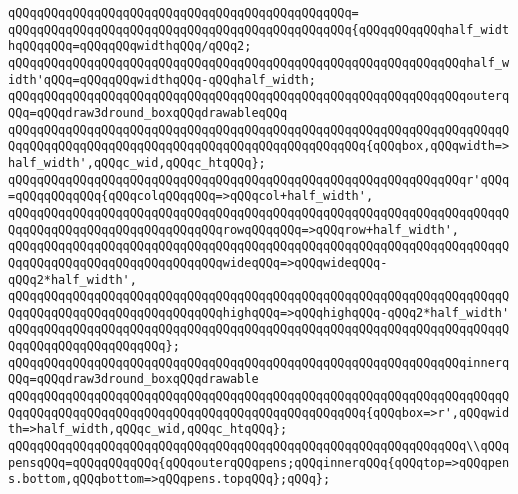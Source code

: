 \verb|qQQqqQQqqQQqqQQqqQQqqQQqqQQqqQQqqQQqqQQqqQQqqQQq=|\newline
\verb|qQQqqQQqqQQqqQQqqQQqqQQqqQQqqQQqqQQqqQQqqQQqqQQq{qQQqqQQqqQQqhalf_widthqQQqqQQq=qQQqqQQqwidthqQQq/qQQq2;|\newline
\verb|qQQqqQQqqQQqqQQqqQQqqQQqqQQqqQQqqQQqqQQqqQQqqQQqqQQqqQQqqQQqqQQqhalf_width'qQQq=qQQqqQQqwidthqQQq-qQQqhalf_width;|\newline
\newline
\verb|qQQqqQQqqQQqqQQqqQQqqQQqqQQqqQQqqQQqqQQqqQQqqQQqqQQqqQQqqQQqqQQqouterqQQq=qQQqdraw3dround_boxqQQqdrawableqQQq|\newline
\verb|qQQqqQQqqQQqqQQqqQQqqQQqqQQqqQQqqQQqqQQqqQQqqQQqqQQqqQQqqQQqqQQqqQQqqQQqqQQqqQQqqQQqqQQqqQQqqQQqqQQqqQQqqQQqqQQqqQQqqQQq{qQQqbox,qQQqwidth=>half_width',qQQqc_wid,qQQqc_htqQQq};|\newline
\newline
\verb|qQQqqQQqqQQqqQQqqQQqqQQqqQQqqQQqqQQqqQQqqQQqqQQqqQQqqQQqqQQqqQQqr'qQQq=qQQqqQQqqQQq{qQQqcolqQQqqQQq=>qQQqcol+half_width',|\newline
\verb|qQQqqQQqqQQqqQQqqQQqqQQqqQQqqQQqqQQqqQQqqQQqqQQqqQQqqQQqqQQqqQQqqQQqqQQqqQQqqQQqqQQqqQQqqQQqqQQqqQQqrowqQQqqQQq=>qQQqrow+half_width',|\newline
\verb|qQQqqQQqqQQqqQQqqQQqqQQqqQQqqQQqqQQqqQQqqQQqqQQqqQQqqQQqqQQqqQQqqQQqqQQqqQQqqQQqqQQqqQQqqQQqqQQqqQQqwideqQQq=>qQQqwideqQQq-qQQq2*half_width',|\newline
\verb|qQQqqQQqqQQqqQQqqQQqqQQqqQQqqQQqqQQqqQQqqQQqqQQqqQQqqQQqqQQqqQQqqQQqqQQqqQQqqQQqqQQqqQQqqQQqqQQqqQQqhighqQQq=>qQQqhighqQQq-qQQq2*half_width'|\newline
\verb|qQQqqQQqqQQqqQQqqQQqqQQqqQQqqQQqqQQqqQQqqQQqqQQqqQQqqQQqqQQqqQQqqQQqqQQqqQQqqQQqqQQqqQQqqQQq};|\newline
\newline
\verb|qQQqqQQqqQQqqQQqqQQqqQQqqQQqqQQqqQQqqQQqqQQqqQQqqQQqqQQqqQQqqQQqinnerqQQq=qQQqdraw3dround_boxqQQqdrawable|\newline
\verb|qQQqqQQqqQQqqQQqqQQqqQQqqQQqqQQqqQQqqQQqqQQqqQQqqQQqqQQqqQQqqQQqqQQqqQQqqQQqqQQqqQQqqQQqqQQqqQQqqQQqqQQqqQQqqQQqqQQqqQQq{qQQqbox=>r',qQQqwidth=>half_width,qQQqc_wid,qQQqc_htqQQq};|\newline
\newline
\verb|qQQqqQQqqQQqqQQqqQQqqQQqqQQqqQQqqQQqqQQqqQQqqQQqqQQqqQQqqQQqqQQq\\qQQqpensqQQq=qQQqqQQqqQQq{qQQqouterqQQqpens;qQQqinnerqQQq{qQQqtop=>qQQqpens.bottom,qQQqbottom=>qQQqpens.topqQQq};qQQq};|\newline
